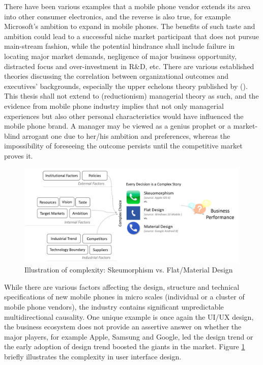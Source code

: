 \documentclass[utf8,english]{gradu3}
\begin{document}
There have been various examples that a mobile phone vendor extends its area into other consumer electronics, and the reverse is also true, for example Microsoft's ambition to expand in mobile phones. The benefits of such taste and ambition could lead to a successful niche market participant that does not pursue main-stream fashion, while the potential hindrance shall include failure in locating major market demands, negligence of major business opportunity, distracted focus and over-investment in R\&D, etc. There are various established theories discussing the correlation between organizational outcomes and executives' backgrounds, especially the upper echelons theory published by \citeauthor{hambrick1984upper} (\citeyear{hambrick1984upper}). This thesis shall not extend to (reductionism) managerial theory as such, and the evidence from mobile phone industry implies that not only managerial experiences but also other personal characteristics would have influenced the mobile phone brand. A manager may be viewed as a genius prophet or a market-blind arrogant one due to her/his ambition and preferences, whereas the impossibility of foreseeing the outcome persists until the competitive market proves it.

\begin{figure}[htb]
    \centering
    \includegraphics[width=0.99\textwidth]{design.png}
    \caption{Illustration of complexity: Skeumorphism vs. Flat/Material Design}
    \label{fig:design}
\end{figure}

While there are various factors affecting the design, structure and technical specifications of new mobile phones in micro scales (individual or a cluster of mobile phone vendors), the industry contains significant unpredictable multidirectional causality. One unique example is once again the UI/UX design, the business ecosystem does not provide an assertive answer on whether the major players, for example Apple, Samsung and Google, led the design trend or the early adoption of design trend boosted the giants in the market. Figure \ref{fig:design} briefly illustrates the complexity in user interface design.
\end{document}
